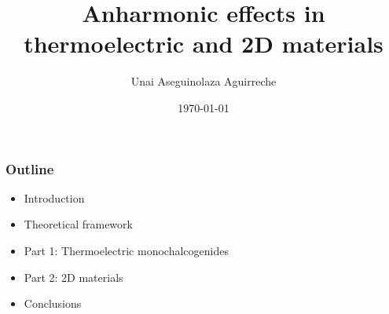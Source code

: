 \documentclass{beamer}
\author{Unai Aseguinolaza Aguirreche}
\title{Anharmonic effects in thermoelectric and 2D materials}
\institute{Supervided by Aitor Bergara and Ion Errea}
\date{\today}
\begin{document}


\begin{frame}
 \titlepage
\end{frame}


%
%


\begin{frame}

\frametitle{Outline}
\begin{itemize}
\item Introduction
\vspace{0.5cm}
\item Theoretical framework
\vspace{0.5cm}
\item Part 1: Thermoelectric monochalcogenides
\vspace{0.5cm}
\item Part 2: 2D materials
\vspace{0.5cm}
\item Conclusions
\end{itemize}

\end{frame}

\end{document}
